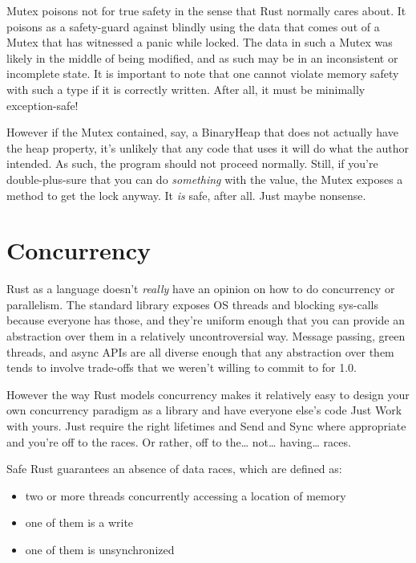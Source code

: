 \documentclass[a4paper,]{book}
\begin{document}
Mutex poisons not for true safety in the sense that Rust normally cares
about. It poisons as a safety-guard against blindly using the data that
comes out of a Mutex that has witnessed a panic while locked. The data
in such a Mutex was likely in the middle of being modified, and as such
may be in an inconsistent or incomplete state. It is important to note
that one cannot violate memory safety with such a type if it is
correctly written. After all, it must be minimally exception-safe!

However if the Mutex contained, say, a BinaryHeap that does not actually
have the heap property, it's unlikely that any code that uses it will do
what the author intended. As such, the program should not proceed
normally. Still, if you're double-plus-sure that you can do
\emph{something} with the value, the Mutex exposes a method to get the
lock anyway. It \emph{is} safe, after all. Just maybe nonsense.

\chapter{Concurrency}\label{sec--concurrency}

Rust as a language doesn't \emph{really} have an opinion on how to do
concurrency or parallelism. The standard library exposes OS threads and
blocking sys-calls because everyone has those, and they're uniform
enough that you can provide an abstraction over them in a relatively
uncontroversial way. Message passing, green threads, and async APIs are
all diverse enough that any abstraction over them tends to involve
trade-offs that we weren't willing to commit to for 1.0.

However the way Rust models concurrency makes it relatively easy to
design your own concurrency paradigm as a library and have everyone
else's code Just Work with yours. Just require the right lifetimes and
Send and Sync where appropriate and you're off to the races. Or rather,
off to the\ldots{} not\ldots{} having\ldots{} races.


Safe Rust guarantees an absence of data races, which are defined as:

\begin{itemize}
\itemsep1pt\parskip0pt
\item
  two or more threads concurrently accessing a location of memory
\item
  one of them is a write
\item
  one of them is unsynchronized
\end{itemize}
\end{document}
